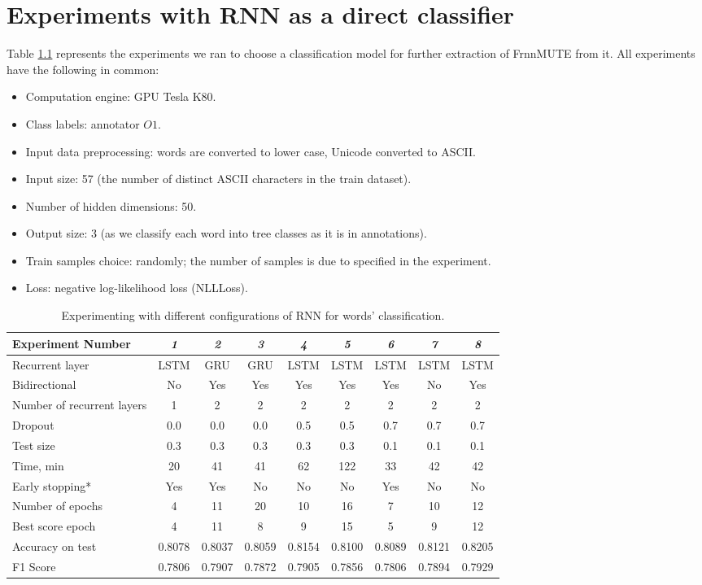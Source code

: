 \chapter{Experiments with RNN as a direct classifier}
\label{appx:rnn}

Table \ref{tab:rnn-experiments} represents the experiments we ran to choose a classification model for further extraction of FrnnMUTE from it. All experiments have the following in common:
\begin{itemize}
    \item Computation engine: GPU Tesla K80.
    \item Class labels: annotator $O1$.
    \item Input data preprocessing: words are converted to lower case, Unicode converted to ASCII.
    \item Input size: 57 (the number of distinct ASCII characters in the train dataset).
    \item Number of hidden dimensions: 50.
    \item Output size: 3 (as we classify each word into tree classes as it is in annotations).
    \item Train samples choice: randomly; the number of samples is due to specified in the experiment.
    \item Loss: negative log-likelihood loss (NLLLoss).
\end{itemize}

\begin{table}[h]
\begin{tabular}{l|cccccccc}
\hline
Experiment Number & \textit{1} & \textit{2} & \textit{3} & \textit{4} & \textit{5} & \textit{6} & \textit{7} & \textit{8} \\ \hline
Recurrent layer & LSTM & GRU & GRU & LSTM & LSTM & LSTM & LSTM & LSTM \\
Bidirectional & No & Yes & Yes & Yes & Yes & Yes & No & Yes \\
Number of recurrent layers & 1 & 2 & 2 & 2 & 2 & 2 & 2 & 2 \\
Dropout & 0.0 & 0.0 & 0.0 & 0.5 & 0.5 & 0.7 & 0.7 & 0.7 \\
Test size & 0.3 & 0.3 & 0.3 & 0.3 & 0.3 & 0.1 & 0.1 & 0.1 \\
Time, min & 20 & 41 & 41 & 62 & 122 & 33 & 42 & 42 \\
Early stopping* & Yes & Yes & No & No & No & Yes & No & No \\
Number of epochs & 4 & 11 & 20 & 10 & 16 & 7 & 10 & 12 \\
Best score epoch & 4 & 11 & 8 & 9 & 15 & 5 & 9 & 12 \\
Accuracy on test & 0.8078 & 0.8037 & 0.8059 & 0.8154 & 0.8100 & 0.8089 & 0.8121 & 0.8205 \\
F1 Score & 0.7806 & 0.7907 & 0.7872 & 0.7905 & 0.7856 & 0.7806 & 0.7894 & 0.7929 \\ \hline
\end{tabular}
  \caption{Experimenting with different configurations of RNN for words' classification.}
  \label{tab:rnn-experiments}
\end{table}

